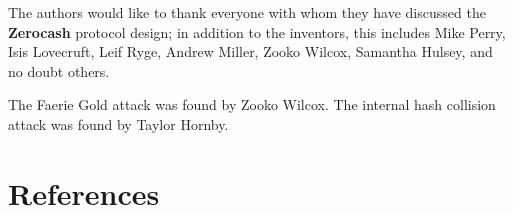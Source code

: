 \documentclass{article}
\newcommand{\termbf}[1]{\textbf{#1}\xspace}
\newcommand{\Zerocash}{\termbf{Zerocash}}
\begin{document}
The authors would like to thank everyone with whom they have discussed
the \Zerocash protocol design; in addition to the inventors, this includes
Mike Perry, Isis Lovecruft, Leif Ryge, Andrew Miller, Zooko Wilcox,
Samantha Hulsey, and no doubt others.

The Faerie Gold attack was found by Zooko Wilcox.
The internal hash collision attack was found by Taylor Hornby.


\section{References}

\begingroup
\renewcommand{\section}[2]{}


\endgroup
\end{document}
